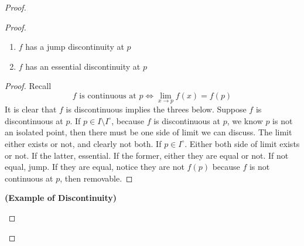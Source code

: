\documentclass{report}
\begin{document}
\begin{proof}
\begin{proof}
\begin{theorem}
\begin{enumerate}[label=(\alph*)]
  \item $f$ has a jump discontinuity at $p$ 
  \item $f$ has an essential discontinuity at $p$
\end{enumerate}
\end{theorem}
\begin{proof}
Recall 
\begin{equation*}
f\text{ is continuous at  }p \iff \lim_{x\to p}f(x)=f(p)
\end{equation*}
It is clear that $f$ is discontinuous implies the threes below. Suppose $f$ is discontinuous at $p$. If $p\in I\setminus I^\circ $, because $f$ is discontinuous at  $p$, we know  $p$ is not an isolated point, then there must be one side of limit we can discuss. The limit either exists or not, and clearly not both. If $p \in I^\circ $. Either both  side of limit exists or not. If the latter, essential. If the former, either they are equal or not. If not equal, jump. If they are equal, notice they are not $f(p)$ because $f$ is not continuous at $p$,  then removable.
\end{proof}
\begin{theorem}
\label{3.11.15}
\textbf{(Example of Discontinuity)} 
\end{theorem}
\end{proof}
\end{proof}
\end{document}
